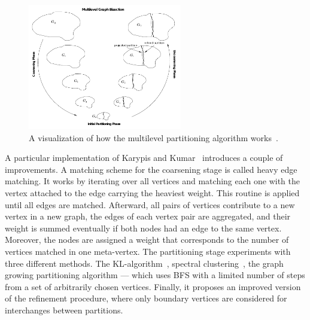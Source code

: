                 \begin{figure}[htp]
                    \begin{center}
                        \includegraphics[keepaspectratio,width=0.6\textwidth]{img/03-graphs/multilevel.png}
                    \end{center}
                    \caption{A visualization of how the multilevel partitioning algorithm works~\autocite{karypis}.} 
                    \label{mlp-fig}
                \end{figure}
                    
                A particular implementation of Karypis and Kumar~\autocite{karypis} introduces a couple of improvements.
                A matching scheme for the coarsening stage is called heavy edge matching.
                It works by iterating over all vertices and matching each one with the vertex attached to the edge carrying the heaviest weight.
                This routine is applied until all edges are matched.
                Afterward, all pairs of vertices contribute to a new vertex in a new graph, the edges of each vertex pair are aggregated, and their weight is summed eventually if both nodes had an edge to the same vertex. 
                Moreover, the nodes are assigned a weight that corresponds to the number of vertices matched in one meta-vertex.
                The partitioning stage experiments with three different methods. The KL-algorithm~\autocite{kl}, spectral clustering~\autocite{spectral}, the graph growing partitioning algorithm --- which uses BFS with a limited number of steps from a set of arbitrarily chosen vertices.
                Finally, it proposes an improved version of the refinement procedure, where only boundary vertices are considered for interchanges between partitions.
                
